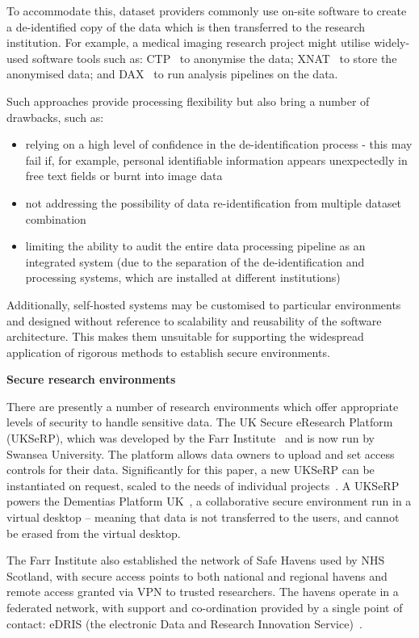 \documentclass[10pt,a4paper,twocolumn]{article}
\begin{document}
To accommodate this, dataset providers commonly use on-site software to create a de-identified copy of the data which is then transferred to the research institution. For example, a medical imaging research project might utilise widely-used software tools such as: CTP~\cite{ctp} to anonymise the data; XNAT~\cite{marcus2007xnat} to store the anonymised data; and DAX~\cite{harrigan2016van} to run analysis pipelines on the data.
 
Such approaches provide processing flexibility but also bring a number of drawbacks, such as:
\begin{itemize}
\item relying on a high level of confidence in the de-identification process - this may fail if, for example, personal identifiable information appears unexpectedly in free text fields or burnt into image data
\item not addressing the possibility of data re-identification from multiple dataset combination 
\item limiting the ability to audit the entire data processing pipeline as an integrated system (due to the separation of the de-identification and processing systems, which are installed at different institutions) 
\end{itemize}

Additionally, self-hosted systems may be customised to particular environments and designed without reference to scalability and reusability of the software architecture. This makes them unsuitable for supporting the widespread application of rigorous methods to establish secure environments.

\textbf{Secure research environments}

There are presently a number of research environments which offer appropriate levels of security to handle sensitive data. The UK Secure eResearch Platform (UKSeRP), which was developed by the Farr Institute~\cite{jones2016uk} and is now run by Swansea University. The platform allows data owners to upload and set access controls for their data. Significantly for this paper, a new UKSeRP can be instantiated on request, scaled to the needs of individual projects~\cite{SAILdatabankbrochure}. A UKSeRP powers the Dementias Platform UK~\cite{dementiasplatform}, a collaborative secure environment run in a virtual desktop – meaning that data is not transferred to the users, and cannot be erased from the virtual desktop.

The Farr Institute also established the network of Safe Havens used by NHS Scotland, with secure access points to both national and regional havens and remote access granted via VPN to trusted researchers. The havens operate in a federated network, with support and co-ordination provided by a single point of contact: eDRIS (the electronic Data and Research Innovation Service)~\cite{eDRIS}.
\end{document}
